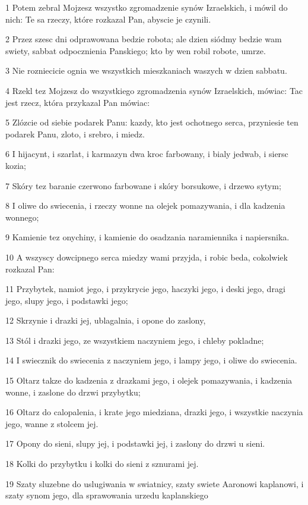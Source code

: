 \par 1 Potem zebral Mojzesz wszystko zgromadzenie synów Izraelskich, i mówil do nich: Te sa rzeczy, które rozkazal Pan, abyscie je czynili.
\par 2 Przez szesc dni odprawowana bedzie robota; ale dzien siódmy bedzie wam swiety, sabbat odpocznienia Panskiego; kto by wen robil robote, umrze.
\par 3 Nie rozniecicie ognia we wszystkich mieszkaniach waszych w dzien sabbatu.
\par 4 Rzekl tez Mojzesz do wszystkiego zgromadzenia synów Izraelskich, mówiac: Tac jest rzecz, która przykazal Pan mówiac:
\par 5 Zlózcie od siebie podarek Panu: kazdy, kto jest ochotnego serca, przyniesie ten podarek Panu, zloto, i srebro, i miedz.
\par 6 I hijacynt, i szarlat, i karmazyn dwa kroc farbowany, i bialy jedwab, i siersc kozia;
\par 7 Skóry tez baranie czerwono farbowane i skóry borsukowe, i drzewo sytym;
\par 8 I oliwe do swiecenia, i rzeczy wonne na olejek pomazywania, i dla kadzenia wonnego;
\par 9 Kamienie tez onychiny, i kamienie do osadzania naramiennika i napiersnika.
\par 10 A wszyscy dowcipnego serca miedzy wami przyjda, i robic beda, cokolwiek rozkazal Pan:
\par 11 Przybytek, namiot jego, i przykrycie jego, haczyki jego, i deski jego, dragi jego, slupy jego, i podstawki jego;
\par 12 Skrzynie i drazki jej, ublagalnia, i opone do zaslony,
\par 13 Stól i drazki jego, ze wszystkiem naczyniem jego, i chleby pokladne;
\par 14 I swiecznik do swiecenia z naczyniem jego, i lampy jego, i oliwe do swiecenia.
\par 15 Oltarz takze do kadzenia z drazkami jego, i olejek pomazywania, i kadzenia wonne, i zaslone do drzwi przybytku;
\par 16 Oltarz do calopalenia, i krate jego miedziana, drazki jego, i wszystkie naczynia jego, wanne z stolcem jej.
\par 17 Opony do sieni, slupy jej, i podstawki jej, i zaslony do drzwi u sieni.
\par 18 Kolki do przybytku i kolki do sieni z sznurami jej.
\par 19 Szaty sluzebne do uslugiwania w swiatnicy, szaty swiete Aaronowi kaplanowi, i szaty synom jego, dla sprawowania urzedu kaplanskiego
